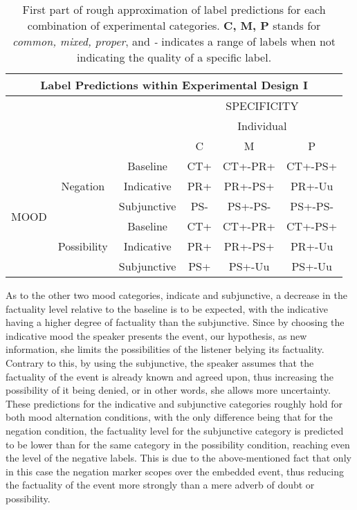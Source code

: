\begin{table}
\centering
\begin{tabular}{|c|c|c|c|c|c|}
\hline
\multicolumn{6}{|c|}{Label Predictions within Experimental Design I}\\\hline
                      & & &\multicolumn{3}{c|}{SPECIFICITY} \\\cline{4-6} 
                      & & & \multicolumn{3}{c|}{Individual}\\\cline{4-6} 
                      & & & C & M & P\\\hline 
\multirow{6}{*}{MOOD} & \multirow{3}{*}{Negation} & Baseline & CT+ & CT+-PR+ & CT+-PS+\\\cline{3-6}
                      &                           & Indicative & PR+ & PR+-PS+ & PR+-Uu \\\cline{3-6}
                      &                           & Subjunctive & PS- & PS+-PS- & PS+-PS-\\ \cline{2-6}\cline{2-6}                     
                      &\multirow{3}{*}{Possibility}& Baseline & CT+ & CT+-PR+ & CT+-PS+\\\cline{3-6}
                      &                           & Indicative & PR+ & PR+-PS+ & PR+-Uu\\\cline{3-6}
                      &                           & Subjunctive & PS+ & PS+-Uu & PS+-Uu\\\hline                                                          
\end{tabular}
\caption[Label predictions I.]{First part of rough approximation of label predictions for each combination of experimental categories. \textbf{C, M, P} stands for \textit{common, mixed, proper}, and \textit{-} indicates a range of labels when not indicating the quality of a specific label.}
\label{tab:pilpredict1}
\end{table}

As to the other two mood categories, indicate and subjunctive, a decrease in the factuality level relative to the baseline is to be expected, with the indicative having a higher degree of factuality than the subjunctive. Since by choosing the indicative mood the speaker presents the event, our hypothesis, as new information, she limits the possibilities of the listener belying its factuality. Contrary to this, by using the subjunctive, the speaker assumes that the factuality of the event is already known and agreed upon, thus increasing the possibility of it being denied, or in other words, she allows more uncertainty. These predictions for the indicative and subjunctive categories roughly hold for both mood alternation conditions, with the only difference being that for the negation condition, the factuality level for the subjunctive category is predicted to be lower than for the same category in the possibility condition, reaching even the level of the negative labels. This is due to the above-mentioned fact that only in this case the negation marker scopes over the embedded event, thus reducing the factuality of the event more strongly than a mere adverb of doubt or possibility.\\

